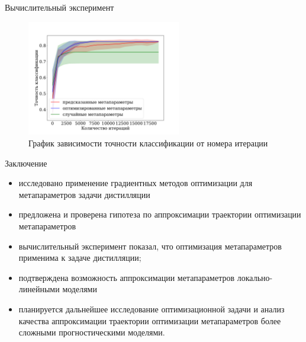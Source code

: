 \documentclass[10pt, aspectratio=169]{beamer}
\begin{document}
\begin{frame}{Вычислительный эксперимент}
\begin{figure}
    \includegraphics[width=0.6\textwidth]{acc_iter.pdf}
    \caption*{График зависимости точности классификации от номера итерации}
\end{figure}
\end{frame}
\begin{frame}{Заключение}
    \begin{itemize}
        \item исследовано применение градиентных методов оптимизации для метапараметров задачи дистилляции
        \item предложена и проверена гипотеза по аппроксимации траектории оптимизации метапараметров 
        \item вычислительный эксперимент показал, что оптимизация метапараметров применима к задаче дистилляции; 
        \item подтверждена возможность аппроксимации метапараметров локально-линейными моделями
        \item планируется дальнейшее исследование оптимизационной задачи и анализ качества  аппроксимации траектории оптимизации метапараметров более сложными прогностическими моделями.
    \end{itemize}
\end{frame}
\end{document}

